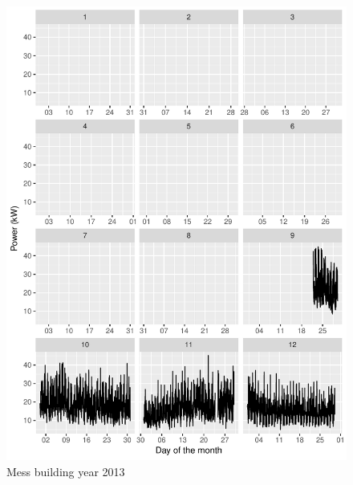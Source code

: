 \documentclass[11pt, oneside]{article}   	%
\begin{document}
\begin{figure}
\includegraphics[keepaspectratio]{mess_build_Y2013.pdf}
\caption{Mess building year 2013 }
\end{figure}
\end{document}
